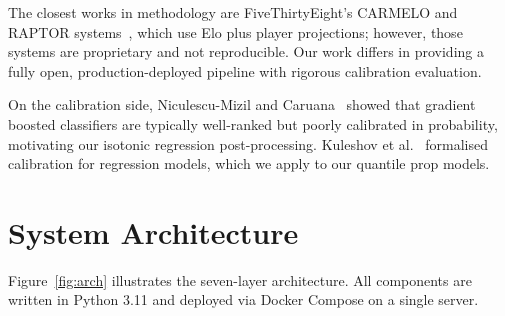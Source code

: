 \documentclass[conference]{IEEEtran}
\begin{document}
The closest works in methodology are FiveThirtyEight's CARMELO and
RAPTOR systems~\cite{silver2015}, which use Elo plus player
projections; however, those systems are proprietary and not reproducible.
Our work differs in providing a fully open, production-deployed pipeline
with rigorous calibration evaluation.

On the calibration side, Niculescu-Mizil and Caruana~\cite{niculescu2005}
showed that gradient boosted classifiers are typically well-ranked but
poorly calibrated in probability, motivating our isotonic regression
post-processing.  Kuleshov et al.~\cite{kuleshov2018} formalised
calibration for regression models, which we apply to our quantile prop
models.

\section{System Architecture}
\label{sec:system}

Figure~\ref{fig:arch} illustrates the seven-layer architecture.
All components are written in Python 3.11 and deployed via Docker
Compose on a single server.
\end{document}
